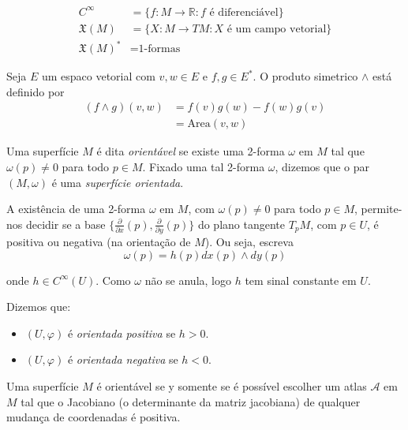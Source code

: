 \begin{nota}
	\begin{align*}
		C^{\infty} &= \{ f: M \rightarrow \mathbb{R}: f \text{ é diferenciável} \}\\
		\mathfrak{X}(M) &= \{ X: M \rightarrow TM: X \text{ é um campo vetorial} \}\\
		\mathfrak{X}(M)^* &= \text{1-formas}
	\end{align*}
\end{nota}

\begin{defi}
	Seja $E$ um espaco vetorial com $v,w \in E$ e $f,g \in E^*$. O produto simetrico $\wedge$ está definido por
	\begin{align*}
		(f \wedge g) (v,w) &= f(v) g(w) - f(w) g(v)\\
		&= \text{Area}(v,w)
	\end{align*}
\end{defi}

\begin{defi}
	Uma superfície $M$ é dita \emph{orientável} se existe uma 2-forma $\omega$ em $M$ tal que $\omega(p) \neq 0$ para todo $p \in M$. Fixado uma tal 2-forma $\omega$, dizemos que o par $(M, \omega)$ é uma \emph{superfície orientada}.	
\end{defi}

A existência de uma 2-forma $\omega$ em $M$, com $\omega(p) \neq 0$ para todo $p \in M$, permite-nos decidir se a base $\{ \frac{\partial}{\partial x}(p), \frac{\partial}{\partial y}(p) \}$ do plano tangente $T_p M$, com $p \in U$, é positiva ou negativa (na orientação de $M$). Ou seja, escreva
\begin{equation*}
	\omega(p) = h(p) dx(p) \wedge dy(p)
\end{equation*}

onde $h \in C^{\infty}(U)$. Como $\omega$ não se anula, logo $h$ tem sinal constante em $U$.

Dizemos que:
\begin{itemize}
	\item $(U, \varphi)$ é \emph{orientada positiva} se $h >0$.
	\item $(U, \varphi)$ é \emph{orientada negativa} se $h<0$.
\end{itemize}

\begin{prop}
	Uma superfície $M$ é orientável se y somente se é possível escolher um atlas $\mathcal{A}$ em $M$ tal que o Jacobiano (o determinante da matriz jacobiana) de qualquer mudança de coordenadas é positiva.
\end{prop}


